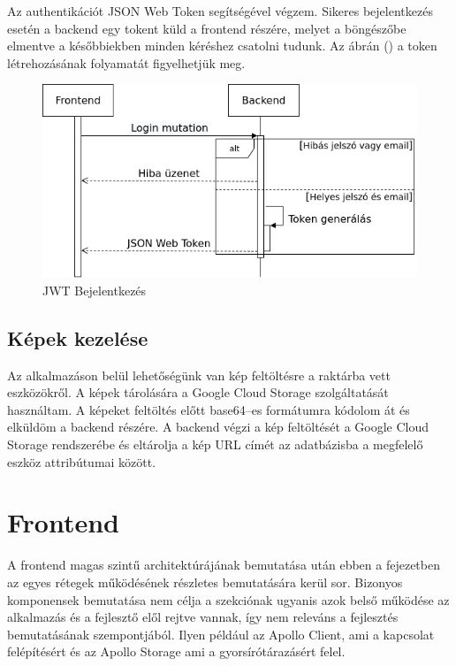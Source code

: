 Az authentikációt JSON Web Token segítségével végzem. 
Sikeres bejelentkezés esetén a backend egy tokent küld a frontend részére, melyet a böngészőbe elmentve a későbbiekben minden kéréshez csatolni tudunk. Az ábrán () a token létrehozásának folyamatát figyelhetjük meg.

\begin{figure}[!ht]
  \centering
  \includegraphics[width=150mm, keepaspectratio]{figures/login.png}
  \caption{JWT Bejelentkezés}
  \label{fig:JWT}
\end{figure}

\subsection{Képek kezelése}
Az alkalmazáson belül lehetőségünk van kép feltöltésre a raktárba vett eszközökről.
A képek tárolására a Google Cloud Storage szolgáltatását használtam. 
A képeket feltöltés előtt base64–es formátumra kódolom át és elküldöm a backend részére.
A backend végzi a kép feltöltését a Google Cloud Storage rendszerébe és eltárolja a kép URL címét az adatbázisba a megfelelő eszköz attribútumai között.

\section{Frontend}
A frontend magas szintű architektúrájának bemutatása után ebben a fejezetben az egyes rétegek működésének részletes bemutatására kerül sor. Bizonyos komponensek bemutatása nem célja a szekciónak ugyanis azok belső működése az alkalmazás és a fejlesztő elől rejtve vannak, így nem releváns a fejlesztés bemutatásának szempontjából. Ilyen például az Apollo Client, ami a kapcsolat felépítésért és az Apollo Storage ami a gyorsírótárazásért felel.


